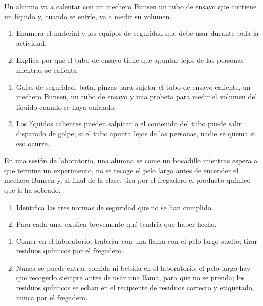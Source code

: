\begin{exercise}
    Un alumno va a calentar con un mechero Bunsen un tubo de ensayo que contiene un líquido y, cuando se enfríe, va a medir su volumen.
    \begin{enumerate}[label=\letraminuscula]
        \item Enumera el material y los equipos de seguridad que debe usar durante toda la actividad.
        \item Explica por qué el tubo de ensayo tiene que apuntar lejos de las personas mientras se calienta.
    \end{enumerate}
    \begin{solu}
        \begin{enumerate}[label=\alph*)]
            \item Gafas de seguridad, bata, pinzas para sujetar el tubo de ensayo caliente, un mechero Bunsen, un tubo de ensayo y una probeta para medir el volumen del líquido cuando se haya enfriado.
            \item Los líquidos calientes pueden salpicar o el contenido del tubo puede salir disparado de golpe; si el tubo apunta lejos de las personas, nadie se quema si eso ocurre.
        \end{enumerate}
    \end{solu}
\end{exercise}

\begin{exercise}
    En una sesión de laboratorio, una alumna se come un bocadillo mientras espera a que termine un experimento, no se recoge el pelo largo antes de encender el mechero Bunsen y, al final de la clase, tira por el fregadero el producto químico que le ha sobrado.
    \begin{enumerate}[label=\letraminuscula]
        \item Identifica las tres normas de seguridad que no se han cumplido.
        \item Para cada una, explica brevemente qué tendría que haber hecho.
    \end{enumerate}
    \begin{solu}
        \begin{enumerate}[label=\alph*)]
            \item Comer en el laboratorio; trabajar con una llama con el pelo largo suelto; tirar residuos químicos por el fregadero.
            \item Nunca se puede entrar comida ni bebida en el laboratorio; el pelo largo hay que recogerlo siempre antes de usar una llama, para que no se prenda; los residuos químicos se echan en el recipiente de residuos correcto y etiquetado, nunca por el fregadero.
        \end{enumerate}
    \end{solu}
\end{exercise}

